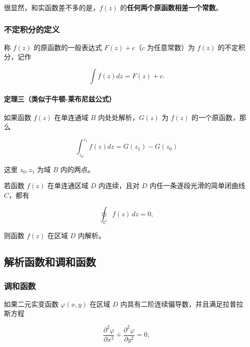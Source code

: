 \begin{tcolorbox}[title={原函数之间的关系},colback=red!5!white
,colframe=red!75!black
,colbacktitle=yellow!50!red
,coltitle=red!25!black, fonttitle=\bfseries,subtitle style={boxrule=0.4pt, colback=yellow!50!red!25!white}]
很显然，和实函数差不多的是，\(f(z)\)
的\textbf{任何两个原函数相差一个常数}。

\end{tcolorbox}
\subsubsection{不定积分的定义}
\label{不定积分的定义}
称 \(f(z)\) 的原函数的一般表达式 \(F(z)+c\)（\(c\) 为任意常数）为
\(f(z)\) 的不定积分，记作

\[
\int f(z)dz=F(z)+c.
\]
\paragraph{定理三（类似于牛顿-莱布尼兹公式）}
\label{定理三类似于牛顿-莱布尼兹公式}
如果函数 \(f(z)\) 在单连通域 \(B\) 内处处解析，\(G(z)\) 为 \(f(z)\)
的一个原函数，那么

\[
\int_{z_0}^{z_1} f(z)dz=G(z_1)-G(z_0)
\]

这里 \(z_0, z_1\) 为域 \(B\) 内的两点。

\begin{tcolorbox}[title={Morera 定理},colback=red!5!white
,colframe=red!75!black
,colbacktitle=yellow!50!red
,coltitle=red!25!black, fonttitle=\bfseries,subtitle style={boxrule=0.4pt, colback=yellow!50!red!25!white}]
若函数 \(f(z)\) 在单连通区域 \(D\) 内连续，且对 \(D\)
内任一条逐段光滑的简单闭曲线 \(C\)，都有

$$
\oint_C f(z) \, dz = 0,
$$

则函数 \(f(z)\) 在区域 \(D\) 内解析。

\end{tcolorbox}
\subsection{解析函数和调和函数}
\label{解析函数和调和函数}
\subsubsection{调和函数}
\label{调和函数}
如果二元实变函数 \(\varphi(x,y)\) 在区域 \(D\)
内具有二阶连续偏导数，并且满足拉普拉斯方程

\[
\frac{\partial^{2}\varphi}{\partial x^{2}} + \frac{\partial^{2}\varphi}{\partial y^{2}} = 0,
\]


